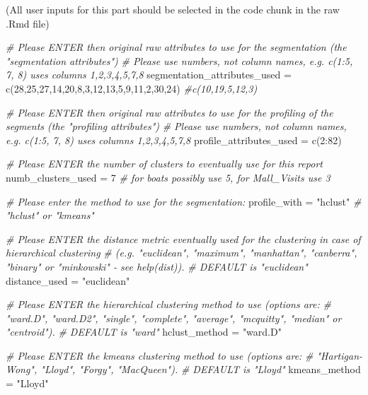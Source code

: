 \documentclass[
]{article}
\newenvironment{Shaded}{\begin{snugshade}}{\end{snugshade}}
\newcommand{\CommentTok}[1]{\textcolor[rgb]{0.56,0.35,0.01}{\textit{#1}}}
\newcommand{\DecValTok}[1]{\textcolor[rgb]{0.00,0.00,0.81}{#1}}
\newcommand{\FunctionTok}[1]{\textcolor[rgb]{0.00,0.00,0.00}{#1}}
\newcommand{\NormalTok}[1]{#1}
\newcommand{\OtherTok}[1]{\textcolor[rgb]{0.56,0.35,0.01}{#1}}
\newcommand{\SpecialCharTok}[1]{\textcolor[rgb]{0.00,0.00,0.00}{#1}}
\newcommand{\StringTok}[1]{\textcolor[rgb]{0.31,0.60,0.02}{#1}}
\begin{document}
(All user inputs for this part should be selected in the code chunk in
the raw .Rmd file)

\begin{Shaded}
\begin{Highlighting}[]
\CommentTok{\# Please ENTER then original raw attributes to use for the segmentation (the "segmentation attributes")}
\CommentTok{\# Please use numbers, not column names, e.g. c(1:5, 7, 8) uses columns 1,2,3,4,5,7,8}
\NormalTok{segmentation\_attributes\_used }\OtherTok{=} \FunctionTok{c}\NormalTok{(}\DecValTok{28}\NormalTok{,}\DecValTok{25}\NormalTok{,}\DecValTok{27}\NormalTok{,}\DecValTok{14}\NormalTok{,}\DecValTok{20}\NormalTok{,}\DecValTok{8}\NormalTok{,}\DecValTok{3}\NormalTok{,}\DecValTok{12}\NormalTok{,}\DecValTok{13}\NormalTok{,}\DecValTok{5}\NormalTok{,}\DecValTok{9}\NormalTok{,}\DecValTok{11}\NormalTok{,}\DecValTok{2}\NormalTok{,}\DecValTok{30}\NormalTok{,}\DecValTok{24}\NormalTok{) }\CommentTok{\#c(10,19,5,12,3) }

\CommentTok{\# Please ENTER then original raw attributes to use for the profiling of the segments (the "profiling attributes")}
\CommentTok{\# Please use numbers, not column names, e.g. c(1:5, 7, 8) uses columns 1,2,3,4,5,7,8}
\NormalTok{profile\_attributes\_used }\OtherTok{=} \FunctionTok{c}\NormalTok{(}\DecValTok{2}\SpecialCharTok{:}\DecValTok{82}\NormalTok{) }

\CommentTok{\# Please ENTER the number of clusters to eventually use for this report}
\NormalTok{numb\_clusters\_used }\OtherTok{=} \DecValTok{7} \CommentTok{\# for boats possibly use 5, for Mall\_Visits use 3}

\CommentTok{\# Please enter the method to use for the segmentation:}
\NormalTok{profile\_with }\OtherTok{=} \StringTok{"hclust"} \CommentTok{\#  "hclust" or "kmeans"}

\CommentTok{\# Please ENTER the distance metric eventually used for the clustering in case of hierarchical clustering }
\CommentTok{\# (e.g. "euclidean", "maximum", "manhattan", "canberra", "binary" or "minkowski" {-} see help(dist)). }
\CommentTok{\# DEFAULT is "euclidean"}
\NormalTok{distance\_used }\OtherTok{=} \StringTok{"euclidean"}

\CommentTok{\# Please ENTER the hierarchical clustering method to use (options are:}
\CommentTok{\# "ward.D", "ward.D2", "single", "complete", "average", "mcquitty", "median" or "centroid").}
\CommentTok{\# DEFAULT is "ward"}
\NormalTok{hclust\_method }\OtherTok{=} \StringTok{"ward.D"}

\CommentTok{\# Please ENTER the kmeans clustering method to use (options are:}
\CommentTok{\# "Hartigan{-}Wong", "Lloyd", "Forgy", "MacQueen").}
\CommentTok{\# DEFAULT is "Lloyd"}
\NormalTok{kmeans\_method }\OtherTok{=} \StringTok{"Lloyd"}
\end{Highlighting}
\end{Shaded}
\end{document}
